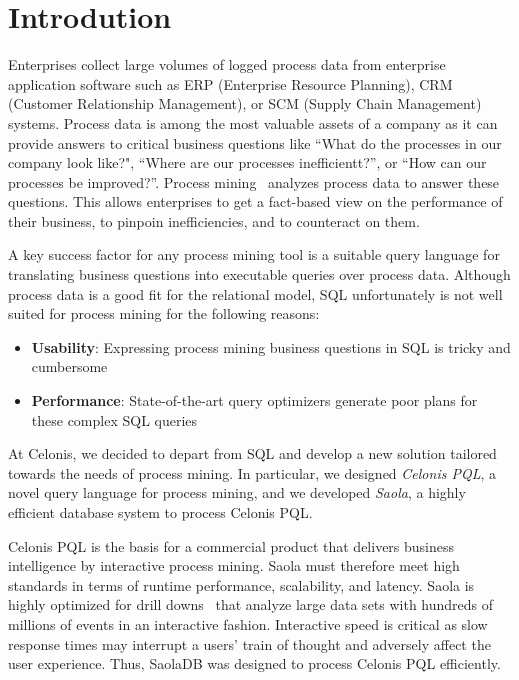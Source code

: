 \section{Introdution}
\label{sec:introduction} 

Enterprises collect large volumes of logged process data from enterprise application software
such as ERP (Enterprise Resource Planning), CRM (Customer Relationship Management),
or SCM (Supply Chain Management) systems. Process data is among the most
valuable assets of a company as it can provide answers to critical business
questions like ``What do the processes in our company look like?", ``Where are
our processes inefficientt?'', or ``How can our processes be improved?''. Process
mining~\cite{process-mining} analyzes process data to answer these questions.
This allows enterprises to get a fact-based view on the performance of their
business, to pinpoin inefficiencies, and to counteract on them.

A key success factor for any process mining tool is a suitable query
language for translating business questions into executable queries over process data. 
Although process data is a good fit for the relational model, SQL unfortunately is not well suited for process mining for the following reasons:

\begin{itemize}
\item \textbf{Usability}: Expressing process mining business questions in SQL is tricky and cumbersome
\item \textbf{Performance}: State-of-the-art query optimizers generate poor plans for these complex SQL queries
\end{itemize}

At Celonis, we decided to depart from SQL and develop a new solution tailored
towards the needs of process mining. In particular, we designed \emph{Celonis PQL}, a novel query language for process mining, and we developed \emph{Saola}, a highly efficient database system to process Celonis PQL. 

Celonis PQL is the basis for a commercial product that delivers business
intelligence by interactive process mining. Saola must therefore meet high 
standards in terms of runtime performance, scalability, and latency. 
Saola is highly optimized for drill downs~\cite{drill-down} that
analyze large data sets with hundreds of millions of events in an interactive
fashion. Interactive speed is critical as slow response times
may interrupt a users' train of thought and adversely affect the user
experience. Thus, SaolaDB was designed to process Celonis PQL efficiently.

